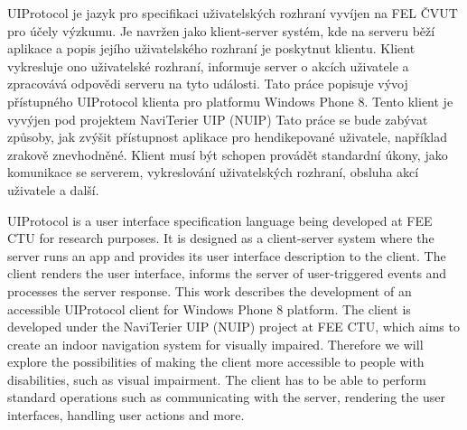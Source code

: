 \startAbstractCz
UIProtocol je jazyk pro specifikaci uživatelských rozhraní vyvíjen na FEL ČVUT pro účely výzkumu. Je navržen jako klient-server systém, kde na serveru běží aplikace a popis jejího uživatelského rozhraní je poskytnut klientu. Klient vykresluje ono uživatelské rozhraní, informuje server o akcích uživatele a zpracovává odpovědi serveru na tyto události. Tato práce popisuje vývoj přístupného UIProtocol klienta pro platformu Windows Phone 8. Tento klient je vyvýjen pod projektem NaviTerier UIP (NUIP) Tato práce se bude zabývat způsoby, jak zvýšit přístupnost aplikace pro hendikepované uživatele, například zrakově znevhodněné. Klient musí být schopen provádět standardní úkony, jako komunikace se serverem, vykreslování uživatelských rozhraní, obsluha akcí uživatele a další.
\stopAbstractCz

\startAbstractEn
UIProtocol is a user interface specification language being developed at FEE CTU for research purposes. It is designed as a client-server system where the server runs an app and provides its user interface description to the client. The client renders the user interface, informs the server of user-triggered events and processes the server response. This work describes the development of an accessible UIProtocol client for Windows Phone 8 platform. The client is developed under the NaviTerier UIP (NUIP) project at FEE CTU, which aims to create an indoor navigation system for visually impaired. Therefore we will explore the possibilities of making the client more accessible to people with disabilities, such as visual impairment. The client has to be able to perform standard operations such as communicating with the server, rendering the user interfaces, handling user actions and more.
\stopAbstractEn

\endinput
